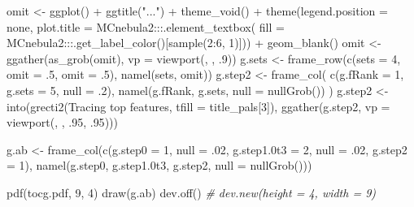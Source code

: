 \documentclass[
]{article}
\newenvironment{Shaded}{\begin{snugshade}}{\end{snugshade}}
\newcommand{\AttributeTok}[1]{\textcolor[rgb]{0.77,0.63,0.00}{#1}}
\newcommand{\CommentTok}[1]{\textcolor[rgb]{0.56,0.35,0.01}{\textit{#1}}}
\newcommand{\DecValTok}[1]{\textcolor[rgb]{0.00,0.00,0.81}{#1}}
\newcommand{\FloatTok}[1]{\textcolor[rgb]{0.00,0.00,0.81}{#1}}
\newcommand{\FunctionTok}[1]{\textcolor[rgb]{0.00,0.00,0.00}{#1}}
\newcommand{\NormalTok}[1]{#1}
\newcommand{\OtherTok}[1]{\textcolor[rgb]{0.56,0.35,0.01}{#1}}
\newcommand{\SpecialCharTok}[1]{\textcolor[rgb]{0.00,0.00,0.00}{#1}}
\newcommand{\StringTok}[1]{\textcolor[rgb]{0.31,0.60,0.02}{#1}}
\begin{document}
\begin{Shaded}
\begin{Highlighting}[]
\NormalTok{omit }\OtherTok{\textless{}{-}} \FunctionTok{ggplot}\NormalTok{() }\SpecialCharTok{+}
  \FunctionTok{ggtitle}\NormalTok{(}\StringTok{"..."}\NormalTok{) }\SpecialCharTok{+}
  \FunctionTok{theme\_void}\NormalTok{() }\SpecialCharTok{+}
  \FunctionTok{theme}\NormalTok{(}\AttributeTok{legend.position =} \StringTok{\textquotesingle{}none\textquotesingle{}}\NormalTok{,}
    \AttributeTok{plot.title =}\NormalTok{ MCnebula2}\SpecialCharTok{:::}\FunctionTok{.element\_textbox}\NormalTok{(}
      \AttributeTok{fill =}\NormalTok{ MCnebula2}\SpecialCharTok{:::}\FunctionTok{.get\_label\_color}\NormalTok{()[}\FunctionTok{sample}\NormalTok{(}\DecValTok{2}\SpecialCharTok{:}\DecValTok{6}\NormalTok{, }\DecValTok{1}\NormalTok{)])) }\SpecialCharTok{+}
  \FunctionTok{geom\_blank}\NormalTok{()}
\NormalTok{omit }\OtherTok{\textless{}{-}} \FunctionTok{ggather}\NormalTok{(}\FunctionTok{as\_grob}\NormalTok{(omit), }\AttributeTok{vp =} \FunctionTok{viewport}\NormalTok{(, , .}\DecValTok{9}\NormalTok{))}
\NormalTok{g.sets }\OtherTok{\textless{}{-}} \FunctionTok{frame\_row}\NormalTok{(}\FunctionTok{c}\NormalTok{(}\AttributeTok{sets =} \DecValTok{4}\NormalTok{, }\AttributeTok{omit =}\NormalTok{ .}\DecValTok{5}\NormalTok{, }\AttributeTok{omit =}\NormalTok{ .}\DecValTok{5}\NormalTok{), }\FunctionTok{namel}\NormalTok{(sets, omit))}
\NormalTok{g.step2 }\OtherTok{\textless{}{-}} \FunctionTok{frame\_col}\NormalTok{(}
  \FunctionTok{c}\NormalTok{(}\AttributeTok{g.fRank =} \DecValTok{1}\NormalTok{, }\AttributeTok{g.sets =} \DecValTok{5}\NormalTok{, }\AttributeTok{null =}\NormalTok{ .}\DecValTok{2}\NormalTok{),}
  \FunctionTok{namel}\NormalTok{(g.fRank, g.sets, }\AttributeTok{null =} \FunctionTok{nullGrob}\NormalTok{())}
\NormalTok{)}
\NormalTok{g.step2 }\OtherTok{\textless{}{-}} \FunctionTok{into}\NormalTok{(}\FunctionTok{grecti2}\NormalTok{(}\StringTok{\textquotesingle{}Tracing top features\textquotesingle{}}\NormalTok{, }\AttributeTok{tfill =}\NormalTok{ title\_pals[}\DecValTok{3}\NormalTok{]),}
  \FunctionTok{ggather}\NormalTok{(g.step2, }\AttributeTok{vp =} \FunctionTok{viewport}\NormalTok{(, , .}\DecValTok{95}\NormalTok{, .}\DecValTok{95}\NormalTok{)))}

\NormalTok{g.ab }\OtherTok{\textless{}{-}} \FunctionTok{frame\_col}\NormalTok{(}\FunctionTok{c}\NormalTok{(}\AttributeTok{g.step0 =} \DecValTok{1}\NormalTok{, }\AttributeTok{null =}\NormalTok{ .}\DecValTok{02}\NormalTok{, }\AttributeTok{g.step1.0t3 =} \DecValTok{2}\NormalTok{, }\AttributeTok{null =}\NormalTok{ .}\DecValTok{02}\NormalTok{, }\AttributeTok{g.step2 =} \DecValTok{1}\NormalTok{),}
  \FunctionTok{namel}\NormalTok{(g.step0, g.step1}\FloatTok{.0}\NormalTok{t3, g.step2, }\AttributeTok{null =} \FunctionTok{nullGrob}\NormalTok{()))}

\FunctionTok{pdf}\NormalTok{(}\StringTok{\textquotesingle{}tocg.pdf\textquotesingle{}}\NormalTok{, }\DecValTok{9}\NormalTok{, }\DecValTok{4}\NormalTok{)}
\FunctionTok{draw}\NormalTok{(g.ab)}
\FunctionTok{dev.off}\NormalTok{()}
\CommentTok{\# dev.new(height = 4, width = 9)}
\end{Highlighting}
\end{Shaded}
\end{document}
